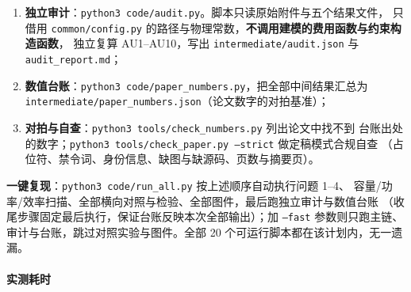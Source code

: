 \begin{enumerate}
        \texttt{--write} 表示按附件 5 模板写出对应结果文件；
        条件项（论文中作为对照或检验给出）另有：\texttt{q4/q4.py --mode tests --K 64}（电价过程检验与
        情景保真度）、\texttt{q4/q4.py --mode cvar --K 64 --step 6}（CVaR 前沿），以及
        \texttt{exp/} 下的 \texttt{exp\_scan.py}（容量、功率与效率扫描、报童经验覆盖率）、
        \texttt{exp\_sobol.py}（Sobol 全局灵敏度）、\texttt{exp\_na.py}（非预期性置换检验）、
        \texttt{exp\_benchmark.py}（全年单一 LP 的完全信息基准）、
        \texttt{exp\_pricecond.py}（负载条件化电价预测对照）、
        \texttt{exp\_redispatch.py}（\textbf{假设 A12 消融：实时再调度}，334 天逐日 LP，实测 5.1~s），
        以及 \texttt{plot/} 下的两个绘图脚本；
   \item \textbf{独立审计}：\texttt{python3 code/audit.py}。脚本只读原始附件与五个结果文件，
         只借用 \texttt{common/config.py} 的路径与物理常数，\textbf{不调用建模的费用函数与约束构造函数}，
         独立复算 AU1--AU10，写出 \texttt{intermediate/audit.json} 与 \texttt{audit\_report.md}；
   \item \textbf{数值台账}：\texttt{python3 code/paper\_numbers.py}，把全部中间结果汇总为
         \texttt{intermediate/paper\_numbers.json}（论文数字的对拍基准）；
   \item \textbf{对拍与自查}：\texttt{python3 tools/check\_numbers.py} 列出论文中找不到
         台账出处的数字；\texttt{python3 tools/check\_paper.py --strict} 做定稿模式合规自查
         （占位符、禁令词、身份信息、缺图与缺源码、页数与摘要页）。
\end{enumerate}

\noindent\textbf{一键复现}：\texttt{python3 code/run\_all.py} 按上述顺序自动执行问题 1--4、
容量/功率/效率扫描、全部横向对照与检验、全部图件，最后跑独立审计与数值台账
（收尾步骤固定最后执行，保证台账反映本次全部输出）；加 \texttt{--fast} 参数则只跑主链、
审计与台账，跳过对照实验与图件。全部 20 个可运行脚本都在该计划内，无一遗漏。

\paragraph{实测耗时}

